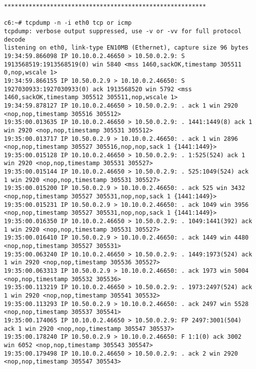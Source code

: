 \documentclass[a4paper,12pt]{article}
\begin{document}
\begin{lstlisting}
*********************************************************

c6:~# tcpdump -n -i eth0 tcp or icmp
tcpdump: verbose output suppressed, use -v or -vv for full protocol decode
listening on eth0, link-type EN10MB (Ethernet), capture size 96 bytes
19:34:59.866098 IP 10.10.0.2.46650 > 10.50.0.2.9: S 1913568519:1913568519(0) win 5840 <mss 1460,sackOK,timestamp 305511 0,nop,wscale 1>
19:34:59.866155 IP 10.50.0.2.9 > 10.10.0.2.46650: S 1927030933:1927030933(0) ack 1913568520 win 5792 <mss 1460,sackOK,timestamp 305512 305511,nop,wscale 1>
19:34:59.878127 IP 10.10.0.2.46650 > 10.50.0.2.9: . ack 1 win 2920 <nop,nop,timestamp 305516 305512>
19:35:00.013635 IP 10.10.0.2.46650 > 10.50.0.2.9: . 1441:1449(8) ack 1 win 2920 <nop,nop,timestamp 305531 305512>
19:35:00.013717 IP 10.50.0.2.9 > 10.10.0.2.46650: . ack 1 win 2896 <nop,nop,timestamp 305527 305516,nop,nop,sack 1 {1441:1449}>
19:35:00.015128 IP 10.10.0.2.46650 > 10.50.0.2.9: . 1:525(524) ack 1 win 2920 <nop,nop,timestamp 305531 305527>
19:35:00.015144 IP 10.10.0.2.46650 > 10.50.0.2.9: . 525:1049(524) ack 1 win 2920 <nop,nop,timestamp 305531 305527>
19:35:00.015200 IP 10.50.0.2.9 > 10.10.0.2.46650: . ack 525 win 3432 <nop,nop,timestamp 305527 305531,nop,nop,sack 1 {1441:1449}>
19:35:00.015231 IP 10.50.0.2.9 > 10.10.0.2.46650: . ack 1049 win 3956 <nop,nop,timestamp 305527 305531,nop,nop,sack 1 {1441:1449}>
19:35:00.016350 IP 10.10.0.2.46650 > 10.50.0.2.9: . 1049:1441(392) ack 1 win 2920 <nop,nop,timestamp 305531 305527>
19:35:00.016410 IP 10.50.0.2.9 > 10.10.0.2.46650: . ack 1449 win 4480 <nop,nop,timestamp 305527 305531>
19:35:00.063240 IP 10.10.0.2.46650 > 10.50.0.2.9: . 1449:1973(524) ack 1 win 2920 <nop,nop,timestamp 305536 305527>
19:35:00.063313 IP 10.50.0.2.9 > 10.10.0.2.46650: . ack 1973 win 5004 <nop,nop,timestamp 305532 305536>
19:35:00.113219 IP 10.10.0.2.46650 > 10.50.0.2.9: . 1973:2497(524) ack 1 win 2920 <nop,nop,timestamp 305541 305532>
19:35:00.113293 IP 10.50.0.2.9 > 10.10.0.2.46650: . ack 2497 win 5528 <nop,nop,timestamp 305537 305541>
19:35:00.174065 IP 10.10.0.2.46650 > 10.50.0.2.9: FP 2497:3001(504) ack 1 win 2920 <nop,nop,timestamp 305547 305537>
19:35:00.178240 IP 10.50.0.2.9 > 10.10.0.2.46650: F 1:1(0) ack 3002 win 6052 <nop,nop,timestamp 305543 305547>
19:35:00.179498 IP 10.10.0.2.46650 > 10.50.0.2.9: . ack 2 win 2920 <nop,nop,timestamp 305547 305543>
\end{lstlisting}
\end{document}
